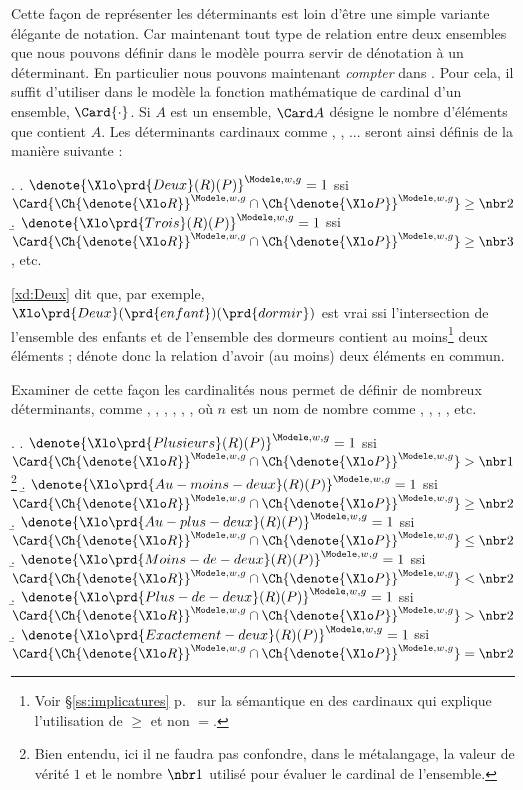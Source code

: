 Cette façon de représenter les déterminants est loin d'être une simple variante élégante de notation. 
Car maintenant tout type de relation entre deux ensembles que nous pouvons définir dans le modèle pourra servir de dénotation à un déterminant. 
En particulier nous pouvons maintenant \emph{compter} dans {\LO}.  Pour cela, il suffit d'utiliser dans le modèle la fonction mathématique de cardinal d'un ensemble, $\Card{\cdot}$.  Si $A$ est un ensemble, $\Card A$ désigne le nombre d'éléments que contient $A$.  
Les déterminants cardinaux comme , , ... 
seront ainsi définis de la manière suivante : 

\ex.
\a.
\(\denote{\Xlo \prd{Deux}(R)(P)}^{\Modele,w,g}=1\) ssi
\(\Card{\Ch{\denote{\Xlo R}}^{\Modele,w,g} \cap \Ch{\denote{\Xlo P}}^{\Modele,w,g}} \geq \nbr2 \) \label{xd:Deux}
\b.
\(\denote{\Xlo \prd{Trois}(R)(P)}^{\Modele,w,g}=1\) ssi
\(\Card{\Ch{\denote{\Xlo R}}^{\Modele,w,g} \cap \Ch{\denote{\Xlo P}}^{\Modele,w,g}} \geq \nbr3 \), etc.

{}\ref{xd:Deux} dit que, par exemple, $\Xlo\prd{Deux}(\prd{enfant})(\prd{dormir})$ est vrai ssi l'intersection de l'ensemble des enfants et de l'ensemble des dormeurs contient au moins\footnote{Voir \S\ref{ss:implicatures} p.~\pageref{ss:implicatures} sur la sémantique en  des cardinaux qui explique l'utilisation de $\geq$ et non $=$.} deux éléments ; 
 dénote donc la relation d'avoir (au moins) deux éléments en commun. 


Examiner de cette façon les cardinalités nous permet de définir de nombreux déterminants, comme , , , , , , où $n$ est un nom de nombre comme , , , , etc.

\ex.
\a.
\(\denote{\Xlo \prd{Plusieurs}(R)(P)}^{\Modele,w,g}=1\) ssi
\(\Card{\Ch{\denote{\Xlo R}}^{\Modele,w,g} \cap \Ch{\denote{\Xlo P}}^{\Modele,w,g}} > \nbr1\)\footnote{Bien entendu, ici il ne faudra pas confondre, dans le métalangage, la valeur de vérité $1$  et le nombre $\nbr1$ utilisé pour évaluer le cardinal de l'ensemble. }
\b.
\(\denote{\Xlo \prd{Au-moins-deux}(R)(P)}^{\Modele,w,g}=1\) ssi
\(\Card{\Ch{\denote{\Xlo R}}^{\Modele,w,g} \cap \Ch{\denote{\Xlo P}}^{\Modele,w,g}} \geq \nbr2\)
\b.
\(\denote{\Xlo \prd{Au-plus-deux}(R)(P)}^{\Modele,w,g}=1\) ssi
\(\Card{\Ch{\denote{\Xlo R}}^{\Modele,w,g} \cap \Ch{\denote{\Xlo P}}^{\Modele,w,g}} \leq \nbr2\)
\b.
\(\denote{\Xlo \prd{Moins-de-deux}(R)(P)}^{\Modele,w,g}=1\) ssi
\(\Card{\Ch{\denote{\Xlo R}}^{\Modele,w,g} \cap \Ch{\denote{\Xlo P}}^{\Modele,w,g}} < \nbr2\)
\b.
\(\denote{\Xlo \prd{Plus-de-deux}(R)(P)}^{\Modele,w,g}=1\) ssi
\(\Card{\Ch{\denote{\Xlo R}}^{\Modele,w,g} \cap \Ch{\denote{\Xlo P}}^{\Modele,w,g}} > \nbr2\)
\b.
\(\denote{\Xlo \prd{Exactement-deux}(R)(P)}^{\Modele,w,g}=1\) ssi
\(\Card{\Ch{\denote{\Xlo R}}^{\Modele,w,g} \cap \Ch{\denote{\Xlo P}}^{\Modele,w,g}} = \nbr2\)


